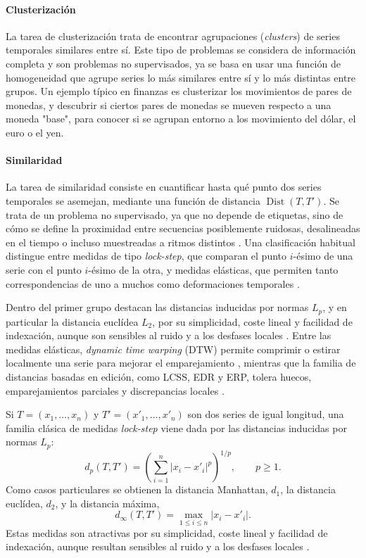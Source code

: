 \documentclass[12pt]{report} %
\begin{document}
\paragraph*{Clusterización}\mbox{}

La tarea de clusterización trata de encontrar agrupaciones (\textit{clusters}) de series temporales similares entre sí. Este tipo de problemas se considera de información completa y son problemas no supervisados, ya se basa en usar una función de homogeneidad que agrupe series lo más similares entre sí y lo más distintas entre grupos. Un ejemplo típico en finanzas es clusterizar los movimientos de pares de monedas, y descubrir si ciertos pares de monedas se mueven respecto a una moneda "base", para conocer si se agrupan entorno a los movimiento del dólar, el euro o el yen.

\paragraph*{Similaridad}\mbox{}

La tarea de similaridad consiste en cuantificar hasta qué punto dos series temporales se asemejan, mediante una función de distancia $\operatorname{Dist}(T, T')$. Se trata de un problema no supervisado, ya que no depende de etiquetas, sino de cómo se define la proximidad entre secuencias posiblemente ruidosas, desalineadas en el tiempo o incluso muestreadas a ritmos distintos \cite{Ding2008,Fu2011}. Una clasificación habitual distingue entre medidas de tipo \textit{lock-step}, que comparan el punto $i$-ésimo de una serie con el punto $i$-ésimo de la otra, y medidas elásticas, que permiten tanto correspondencias de uno a muchos como deformaciones temporales \cite{Ding2008}.

Dentro del primer grupo destacan las distancias inducidas por normas $L_p$, y en particular la distancia euclídea $L_2$, por su simplicidad, coste lineal y facilidad de indexación, aunque son sensibles al ruido y a los desfases locales \cite{Faloutsos1994}. Entre las medidas elásticas, \textit{dynamic time warping} (DTW) permite comprimir o estirar localmente una serie para mejorar el emparejamiento \cite{BerndtClifford1994}, mientras que la familia de distancias basadas en edición, como LCSS, EDR y ERP, tolera huecos, emparejamientos parciales y discrepancias locales \cite{Ding2008,ChenOzsuOria2005,ChenNg2004}.

Si $T = (x_1, \ldots, x_n)$ y $T' = (x'_1, \ldots, x'_n)$ son dos series de igual longitud, una familia clásica de medidas \textit{lock-step} viene dada por las distancias inducidas por normas $L_p$:
$$
    d_p(T, T') = \left(\sum_{i=1}^{n} |x_i - x'_i|^p\right)^{1/p}, \qquad p \geq 1.
$$
Como casos particulares se obtienen la distancia Manhattan, $d_1$, la distancia euclídea, $d_2$, y la distancia máxima,
$$
    d_{\infty}(T, T') = \max_{1 \leq i \leq n} |x_i - x'_i|.
$$
Estas medidas son atractivas por su simplicidad, coste lineal y facilidad de indexación, aunque resultan sensibles al ruido y a los desfases locales \cite{Faloutsos1994}.
\end{document}
